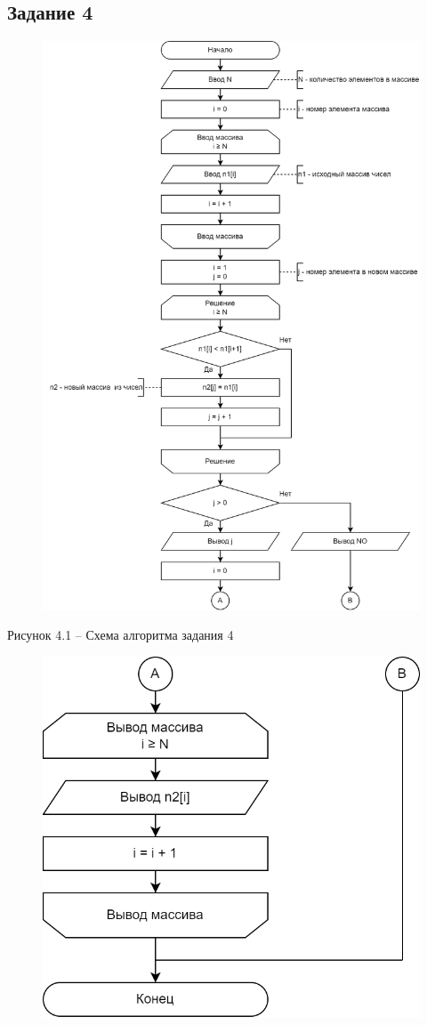 \documentclass[a4paper,14pt]{extarticle}
\begin{document}
	\newpage
	\subsection*{Задание 4}
	\begin{figure}[h]
		\centering
		\includegraphics[width=0.78\linewidth]{schemes/s-4-1}
	\end{figure}
	\begin{center}
		Рисунок 4.1 – Схема алгоритма задания 4
	\end{center}
	\pagebreak
	\begin{figure}[h]
		\centering
		\includegraphics[width=0.45\linewidth]{schemes/s-4-2}
	\end{figure}
\end{document}
